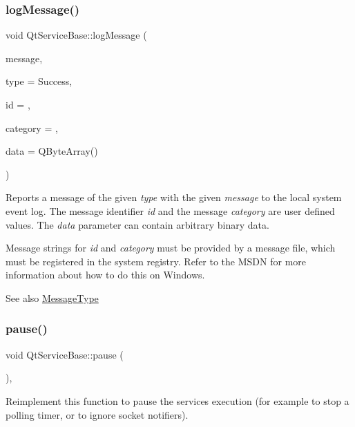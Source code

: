 \subsubsection{\texorpdfstring{log\+Message()}{logMessage()}}
{\footnotesize\ttfamily void Qt\+Service\+Base\+::log\+Message (\begin{DoxyParamCaption}\item[{const Q\+String \&}]{message,  }\item[{\hyperlink{class_qt_service_base_acffd9389fe7178bf1f35d8bf3dae1095}{Qt\+Service\+Base\+::\+Message\+Type}}]{type = {\ttfamily Success},  }\item[{int}]{id = {},  }\item[{uint}]{category = {},  }\item[{const Q\+Byte\+Array \&}]{data = {\ttfamily QByteArray()} }\end{DoxyParamCaption})}

Reports a message of the given {\itshape type} with the given {\itshape message} to the local system event log. The message identifier {\itshape id} and the message {\itshape category} are user defined values. The {\itshape data} parameter can contain arbitrary binary data.

Message strings for {\itshape id} and {\itshape category} must be provided by a message file, which must be registered in the system registry. Refer to the M\+S\+DN for more information about how to do this on Windows.

\begin{DoxySeeAlso}{See also}
\hyperlink{class_qt_service_base_acffd9389fe7178bf1f35d8bf3dae1095}{Message\+Type} 
\end{DoxySeeAlso}
\mbox{\label{class_qt_service_base_a43215a7c5c047d30bcf4f697e6691f89}} 
\subsubsection{\texorpdfstring{pause()}{pause()}}
{\footnotesize\ttfamily void Qt\+Service\+Base\+::pause (\begin{DoxyParamCaption}{ }\end{DoxyParamCaption})\hspace{0.3cm}{\ttfamily [protected]}, {\ttfamily [virtual]}}

Reimplement this function to pause the service\textquotesingle{}s execution (for example to stop a polling timer, or to ignore socket notifiers).

